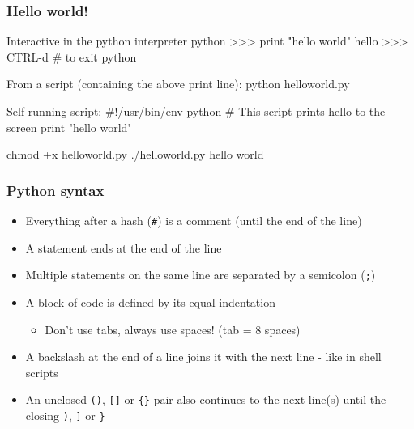 \documentclass[hyperref={colorlinks=true}]{beamer}
\begin{document}
\begin{frame}[fragile]
  \frametitle{Hello world!}

  \begin{ucpythonblock}{Interactive in the python interpreter}
python
>>> print "hello world"
hello
>>> CTRL-d  # to exit python
  \end{ucpythonblock}
  
  \begin{ucpythonblock}{From a script (containing the above print line):}
python helloworld.py
  \end{ucpythonblock}
  
  \begin{ucpythonblock}{Self-running script:}
#!/usr/bin/env python
# This script prints hello to the screen
print "hello world"
  \end{ucpythonblock}
  
  \begin{ucpythonblock}{}
chmod +x helloworld.py
./helloworld.py
hello world
  \end{ucpythonblock}
  
\end{frame}


\begin{frame}[fragile]
  \frametitle{Python syntax}

  \begin{itemize}
    \item Everything after a hash (\texttt{\#}) is a comment (until the end of the line)
    \item A statement ends at the end of the line
    \item Multiple statements on the same line are separated by a semicolon (\texttt{;})
    \item A block of code is defined by its equal indentation
    \begin{itemize}
       \item Don't use tabs, always use spaces! (tab = 8 spaces)
    \end{itemize}
    \item A backslash at the end of a line joins it with the next line - like in shell scripts
    \item An unclosed \texttt{()}, \texttt{[]} or \texttt{\{\}} pair also continues to the next line(s) until the closing \texttt{)}, \texttt{]} or \texttt{\}}
  \end{itemize}
  
\end{frame}
\end{document}
